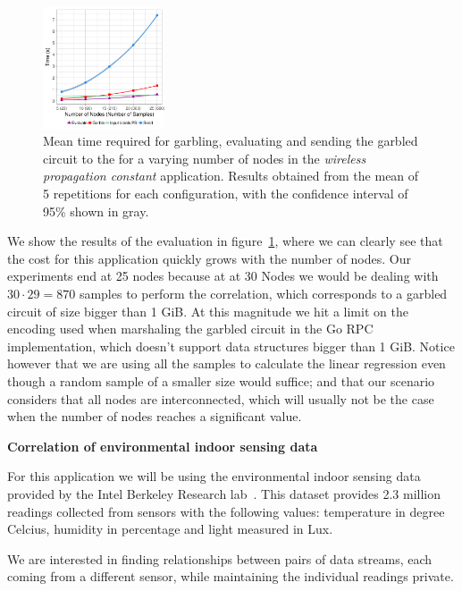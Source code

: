 \begin{figure}
  \includegraphics[width=0.32\textwidth]{plots/turonet.png}
  \caption{Mean time required for garbling, evaluating and sending the garbled
    circuit to the \broker for a varying number of nodes in the \emph{wireless
    propagation constant} application.  Results obtained from the mean of 5
    repetitions for each configuration, with the confidence interval of 95\% shown
    in gray.}
  \label{turonet-times}
\end{figure}

We show the results of the evaluation in figure~\ref{turonet-times}, where we
can clearly see that the cost for this application quickly grows with the
number of nodes.  Our experiments end at 25 nodes because at at 30 Nodes we
would be dealing with $30 \cdot 29 = 870$ samples to perform the correlation,
which corresponds to a garbled circuit of size bigger than 1 GiB.  At this
magnitude we hit a limit on the encoding used when marshaling the garbled
circuit in the Go RPC implementation, which doesn't support data structures
bigger than 1 GiB.  Notice however that we are using all the samples to
calculate the linear regression even though a random sample of a smaller size
would suffice; and that our scenario considers that all nodes are
interconnected, which will usually not be the case when the number of nodes
reaches a significant value.

\smallskip
\noindent\textbf{Correlation of environmental indoor sensing data}

\noindent For this application we will be using the environmental indoor sensing data
provided by the Intel Berkeley Research
lab~\cite{berdata}.  This dataset provides 2.3 million readings collected
from sensors with the following values: temperature in degree Celcius, humidity
in percentage and light measured in Lux.

We are interested in finding relationships between pairs of data streams, each
coming from a different sensor, while maintaining the individual readings
private.

